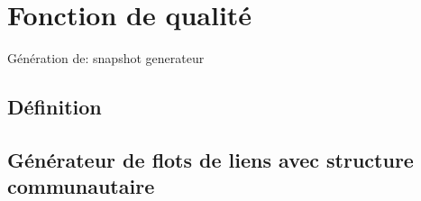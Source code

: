 \chapter{Fonction de qualité}
\minitoc


Génération de: \cite{Granell2015, Karsai2014,Perra2012} snapshot
generateur \cite{Starnini2013,Vestergaard2014}
\cite{Moinet2015}
\cite{Stehle2010}
\section{Définition}
\section{Générateur de flots de liens avec structure communautaire}